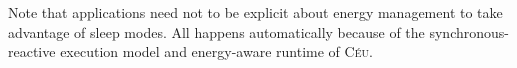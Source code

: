 \documentclass[sigplan,10pt,review,anonymous]{acmart}\settopmatter{printfolios=true,printccs=false,printacmref=false}
\newcommand{\CEU}{\textsc{C\'{e}u}\xspace}
\begin{document}
Note that applications need not to be explicit about energy management to take
advantage of sleep modes.
All happens automatically because of the synchronous-reactive execution model
and energy-aware runtime of \CEU.

\end{document}
